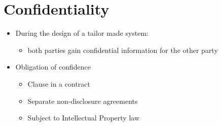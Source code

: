 \documentclass{article}
\begin{document}
\section{Confidentiality}
\begin{itemize}
\item During the design of a tailor made system:
\begin{itemize}
\item both parties gain confidential information for the other party
\end{itemize}
\item Obligation of confidence
\begin{itemize}
\item Clause in a contract
\item Separate non-disclosure agreements
\item Subject to Intellectual Property law
\end{itemize}
\end{itemize}
\end{document}
